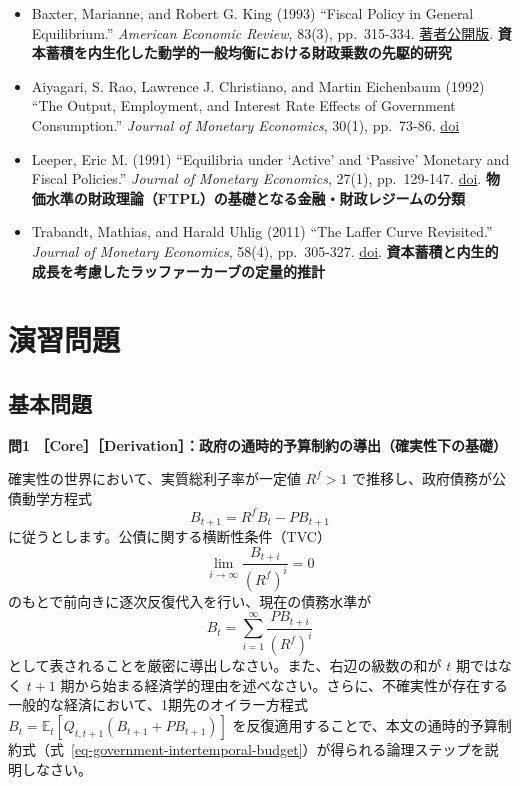 \documentclass[
  japanese,
  lualatex,
  ja=standard,
  12pt,
  a4paper]{ltjsarticle}
\providecommand{\tightlist}{%
  \setlength{\itemsep}{0pt}\setlength{\parskip}{0pt}}
\begin{document}
\begin{itemize}
\tightlist
\item
  Baxter, Marianne, and Robert G. King (1993) ``Fiscal Policy in General
  Equilibrium.'' \emph{American Economic Review}, 83(3), pp.~315-334.
  \href{https://people.bu.edu/mbaxter/papers/fpol.pdf}{著者公開版}.
  \textbf{資本蓄積を内生化した動学的一般均衡における財政乗数の先駆的研究}
\item
  Aiyagari, S. Rao, Lawrence J. Christiano, and Martin Eichenbaum (1992)
  ``The Output, Employment, and Interest Rate Effects of Government
  Consumption.'' \emph{Journal of Monetary Economics}, 30(1), pp.~73-86.
  \href{https://doi.org/10.1016/0304-3932(92)90045-4}{doi}
\item
  Leeper, Eric M. (1991) ``Equilibria under `Active' and `Passive'
  Monetary and Fiscal Policies.'' \emph{Journal of Monetary Economics},
  27(1), pp.~129-147.
  \href{https://doi.org/10.1016/0304-3932(91)90007-B}{doi}.
  \textbf{物価水準の財政理論（FTPL）の基礎となる金融・財政レジームの分類}
\item
  Trabandt, Mathias, and Harald Uhlig (2011) ``The Laffer Curve
  Revisited.'' \emph{Journal of Monetary Economics}, 58(4), pp.~305-327.
  \href{https://doi.org/10.1016/j.jmoneco.2011.07.003}{doi}.
  \textbf{資本蓄積と内生的成長を考慮したラッファーカーブの定量的推計}
\end{itemize}

\clearpage

\section{演習問題}\label{ux6f14ux7fd2ux554fux984c}

\subsection{基本問題}\label{ux57faux672cux554fux984c}

\textbf{問1
［Core］［Derivation］：政府の通時的予算制約の導出（確実性下の基礎）}

確実性の世界において、実質総利子率が一定値 \(R^f > 1\)
で推移し、政府債務が公債動学方程式 \[
B_{t+1} = R^f B_t - PB_{t+1}
\] に従うとします。公債に関する横断性条件（TVC） \[
\lim_{i \to \infty} \frac{B_{t+i}}{(R^f)^i} = 0
\] のもとで前向きに逐次反復代入を行い、現在の債務水準が \[
B_t = \sum_{i=1}^\infty \frac{PB_{t+i}}{(R^f)^i}
\] として表されることを厳密に導出しなさい。また、右辺の級数の和が \(t\)
期ではなく \(t+1\)
期から始まる経済学的理由を述べなさい。さらに、不確実性が存在する一般的な経済において、1期先のオイラー方程式
\(B_t = \mathbb{E}_t [Q_{t,t+1}(B_{t+1} + PB_{t+1})]\)
を反復適用することで、本文の通時的予算制約式（式~\ref{eq-government-intertemporal-budget}）が得られる論理ステップを説明しなさい。
\end{document}
